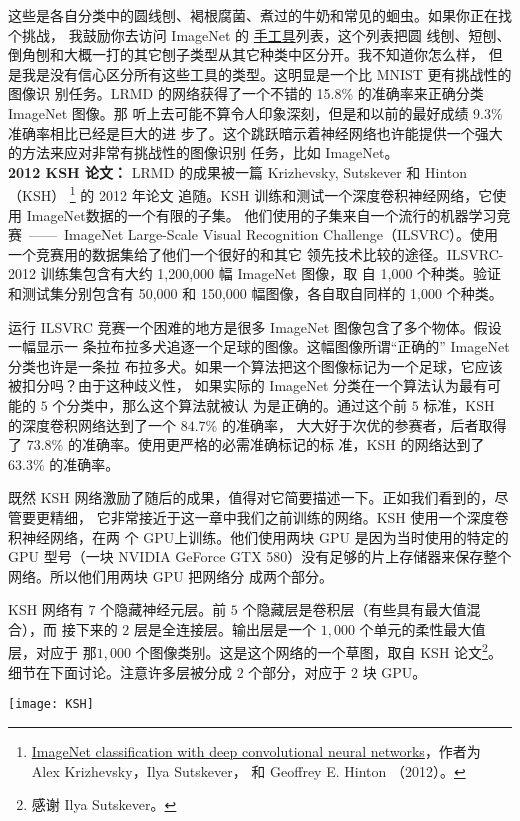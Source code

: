这些是各自分类中的圆线刨、褐根腐菌、煮过的牛奶和常见的蛔虫。如果你正在找个挑战，
我鼓励你去访问 ImageNet 的%
\href{http://www.image-net.org/synset?wnid=n03489162}{手工具}列表，这个列表把圆
线刨、短刨、倒角刨和大概一打的其它刨子类型从其它种类中区分开。我不知道你怎么样，
但是我是没有信心区分所有这些工具的类型。这明显是一个比 MNIST 更有挑战性的图像识
别任务。LRMD 的网络获得了一个不错的 15.8\% 的准确率来正确分类 ImageNet 图像。那
听上去可能不算令人印象深刻，但是和以前的最好成绩 9.3\% 准确率相比已经是巨大的进
步了。这个跳跃暗示着神经网络也许能提供一个强大的方法来应对非常有挑战性的图像识别
任务，比如 ImageNet。\\

\textbf{2012 KSH 论文：} LRMD 的成果被一篇 Krizhevsky,
Sutskever 和 Hinton （KSH）
\footnote{\href{http://www.cs.toronto.edu/~fritz/absps/imagenet.pdf}{ImageNet
    classification with deep convolutional neural networks}，作者为 Alex
  Krizhevsky，Ilya Sutskever， 和 Geoffrey E. Hinton （2012）。} 的 2012 年论文
追随。KSH 训练和测试一个深度卷积神经网络，它使用 ImageNet数据的一个有限的子集。
他们使用的子集来自一个流行的机器学习竞赛~——~ImageNet Large-Scale Visual
Recognition Challenge（ILSVRC）。使用一个竞赛用的数据集给了他们一个很好的和其它
领先技术比较的途径。ILSVRC-2012 训练集包含有大约 1,200,000 幅 ImageNet 图像，取
自 1,000 个种类。验证和测试集分别包含有 50,000 和 150,000 幅图像，各自取自同样的
1,000 个种类。

运行 ILSVRC 竞赛一个困难的地方是很多 ImageNet 图像包含了多个物体。假设一幅显示一
条拉布拉多犬追逐一个足球的图像。这幅图像所谓“正确的” ImageNet 分类也许是一条拉
布拉多犬。如果一个算法把这个图像标记为一个足球，它应该被扣分吗？由于这种歧义性，
如果实际的 ImageNet 分类在一个算法认为最有可能的 $5$ 个分类中，那么这个算法就被认
为是正确的。通过这个前 $5$ 标准，KSH 的深度卷积网络达到了一个 $84.7$\% 的准确率，
大大好于次优的参赛者，后者取得了 $73.8$\% 的准确率。使用更严格的必需准确标记的标
准，KSH 的网络达到了 $63.3$\% 的准确率。

既然 KSH 网络激励了随后的成果，值得对它简要描述一下。正如我们看到的，尽管要更精细，
它非常接近于这一章中我们之前训练的网络。KSH 使用一个深度卷积神经网络，在两
个 GPU上训练。他们使用两块 GPU 是因为当时使用的特定的 GPU 型号（一块 NVIDIA
GeForce GTX 580）没有足够的片上存储器来保存整个网络。所以他们用两块 GPU 把网络分
成两个部分。

KSH 网络有 $7$ 个隐藏神经元层。前 $5$ 个隐藏层是卷积层（有些具有最大值混合），而
接下来的 $2$ 层是全连接层。输出层是一个 $1,000$ 个单元的柔性最大值层，对应于
那$1,000$ 个图像类别。这是这个网络的一个草图，取自 KSH 论文\footnote{感谢 Ilya
  Sutskever。}。细节在下面讨论。注意许多层被分成 $2$ 个部分，对应于 $2$ 块 GPU。
\begin{center}
\texttt{[image: KSH]}
\end{center}

